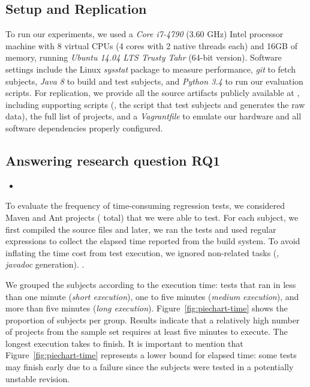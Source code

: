 \subsection{Setup and Replication}
\label{sec:setup}

To run our experiments, we used a \emph{Core i7-4790} (3.60 GHz) Intel
processor machine with 8 virtual CPUs (4 cores with 2 native threads
each) and 16GB of memory, running \emph{Ubuntu 14.04 LTS Trusty Tahr}
(64-bit version). Software settings include the Linux \emph{sysstat}
package to measure performance, \emph{git} to fetch subjects,
\emph{Java 8} to build and test subjects, and \emph{Python 3.4} to run
our evaluation scripts. For replication, we provide all the source
artifacts publicly available at , including
supporting scripts (\eg, the script that test subjects and generates
the raw data), the full list of projects, and a \emph{Vagrantfile} to
emulate our hardware and all software dependencies properly configured.

\subsection{Answering research question RQ1}
\label{sec:rqone}

\begin{itemize}
    \item \RQA
\end{itemize}

To evaluate the frequency of time-consuming regression tests, we
considered  Maven and  Ant projects ( total)
that we were able to test. For each subject, we first compiled the
source files and later, we ran the tests and used regular expressions
to collect the elapsed time reported from the build system. To avoid
inflating the time cost from test execution, we ignored non-related
tasks (\eg, \emph{javadoc} generation). .

We grouped the subjects according to the execution time: tests that
ran in less than one minute (\emph{short execution}), one to five
minutes (\emph{medium execution}), and more than five minutes
(\emph{long execution}).  Figure~\ref{fig:piechart-time} shows the
proportion of subjects per group.  Results indicate that a relatively
high number of projects from the sample set requires at least five
minutes to execute. The longest execution takes  to finish. It
is important to mention that Figure~\ref{fig:piechart-time} represents
a lower bound for elapsed time: some tests may finish early due to a
failure since the subjects were tested in a potentially unstable
revision.

